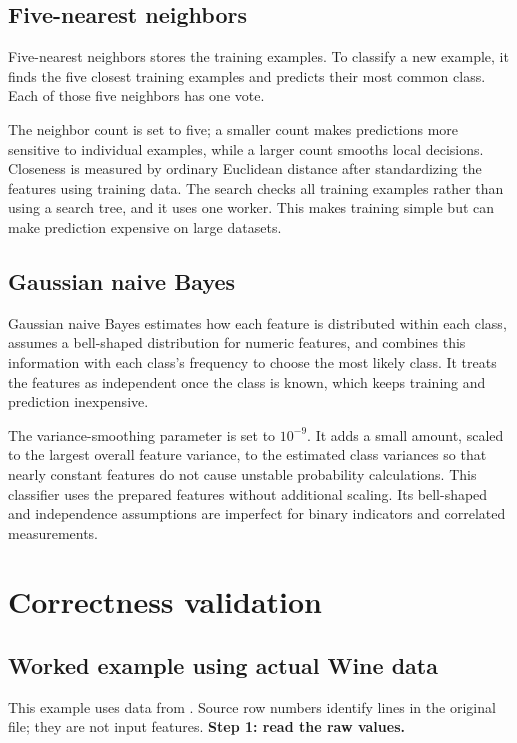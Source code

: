 \documentclass[11pt,letterpaper]{article}
\newcommand{\code}[1]{\texttt{\detokenize{#1}}}
\begin{document}
\subsection{Five-nearest neighbors}
Five-nearest neighbors stores the training examples. To classify a new example,
it finds the five closest training examples and predicts their most common
class. Each of those five neighbors has one vote.

The neighbor count is set to five; a smaller count makes predictions more
sensitive to individual examples, while a larger count smooths local decisions.
Closeness is measured by ordinary Euclidean distance after standardizing the
features using training data. The search checks all training examples rather
than using a search tree, and it uses one worker. This makes training simple
but can make prediction expensive on large datasets.

\subsection{Gaussian naive Bayes}
Gaussian naive Bayes estimates how each feature is distributed within each
class, assumes a bell-shaped distribution for numeric features, and combines
this information with each class's frequency to choose the most likely class.
It treats the features as independent once the class is known, which keeps
training and prediction inexpensive.

The variance-smoothing parameter is set to $10^{-9}$. It adds a small amount,
scaled to the largest overall feature variance, to the estimated class variances
so that nearly constant features do not cause unstable probability calculations.
This classifier uses the prepared features without additional scaling. Its
bell-shaped and independence assumptions are imperfect for binary indicators
and correlated measurements.

\section{Correctness validation}
\subsection{Worked example using actual Wine data}\label{sec:realexample}
This example uses data from 
\code{data/raw/benchmark9/wine.data}. 
Source row numbers identify lines in the original file; they are not input features. 
\textbf{Step 1: read the raw values.}

\end{document}
